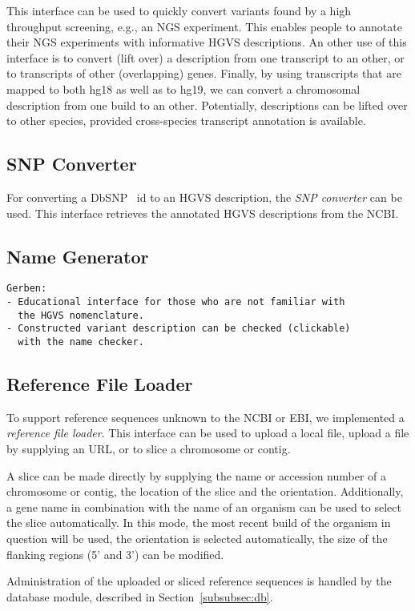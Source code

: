 \documentclass{article}
\begin{document}
This interface can be used to quickly convert variants found by a high
throughput screening, e.g., an NGS experiment. This enables people to annotate
their NGS experiments with informative HGVS descriptions. An other use of this
interface is to convert (lift over) a description from one transcript to an
other, or to transcripts of other (overlapping) genes. Finally, by using
transcripts that are mapped to both hg18 as well as to hg19, we can convert a
chromosomal description from one build to an other. Potentially, descriptions
can be lifted over to other species, provided cross-species transcript
annotation is available.

\subsection{SNP Converter} \label{subsec:snpconvert}
For converting a DbSNP~\cite{DBSNP} id to an HGVS description, the \emph{SNP
converter} can be used. This interface retrieves the annotated HGVS
descriptions from the NCBI.

\subsection{Name Generator}
\begin{verbatim}
Gerben:
- Educational interface for those who are not familiar with
  the HGVS nomenclature.
- Constructed variant description can be checked (clickable)
  with the name checker.
\end{verbatim}

\subsection{Reference File Loader}
To support reference sequences unknown to the NCBI or EBI, we implemented a
\emph{reference file loader}. This interface can be used to upload a local
file, upload a file by supplying an URL, or to slice a chromosome or contig.

A slice can be made directly by supplying the name or accession number of a
chromosome or contig, the location of the slice and the orientation.
Additionally, a gene name in combination with the name of an organism can be
used to select the slice automatically. In this mode, the most recent build of
the organism in question will be used, the orientation is selected
automatically, the size of the flanking regions (5' and 3') can be modified.

Administration of the uploaded or sliced reference sequences is handled by the
database module, described in Section~\ref{subsubsec:db}.
\end{document}
